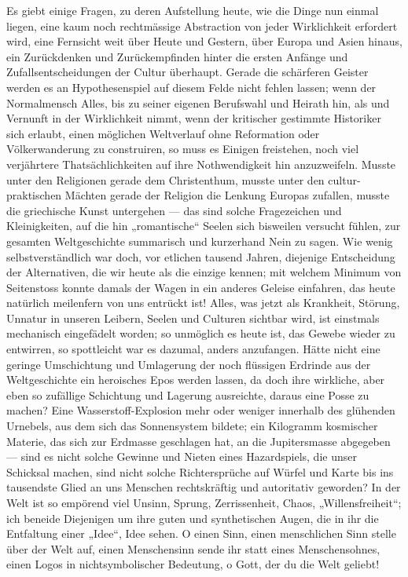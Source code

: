 Es giebt einige Fragen, zu deren Aufstellung heute, wie die Dinge nun einmal liegen, eine kaum noch rechtmässige Abstraction von jeder Wirklichkeit erfordert wird, eine Fernsicht weit über Heute und Gestern, über Europa und Asien hinaus, ein Zurückdenken und Zurückempfinden hinter die ersten Anfänge und Zufallsentscheidungen der Cultur überhaupt. Gerade die schärferen Geister werden es an Hypothesenspiel auf diesem Felde nicht fehlen lassen; wenn der Normalmensch Alles, bis zu seiner eigenen Berufswahl und Heirath hin, als  und Vernunft in der Wirklichkeit nimmt, wenn der kritischer gestimmte Historiker sich erlaubt, einen möglichen Weltverlauf ohne Reformation oder Völkerwanderung zu construiren, so muss es Einigen freistehen, noch viel verjährtere Thatsächlichkeiten auf ihre Nothwendigkeit hin anzuzweifeln. Musste unter den Religionen gerade dem Christenthum, musste unter den cultur-praktischen Mächten gerade der Religion die Lenkung Europas zufallen, musste die griechische Kunst untergehen — das sind solche Fragezeichen und Kleinigkeiten, auf die hin „romantische“ Seelen sich bisweilen versucht fühlen, zur gesamten Weltgeschichte summarisch und kurzerhand Nein zu sagen. Wie wenig selbstverständlich war doch, vor etlichen tausend Jahren, diejenige Entscheidung der Alternativen, die wir heute als die einzige kennen; mit welchem Minimum von Seitenstoss konnte damals der Wagen in ein anderes Geleise einfahren, das heute natürlich meilenfern von uns entrückt ist! Alles, was jetzt als Krankheit, Störung, Unnatur in unseren Leibern, Seelen und Culturen sichtbar wird, ist einstmals mechanisch eingefädelt worden; so unmöglich es heute ist, das Gewebe wieder zu entwirren, so spottleicht war es dazumal, anders anzufangen. Hätte nicht eine geringe Umschichtung und Umlagerung der noch flüssigen Erdrinde aus der Weltgeschichte ein heroisches Epos werden lassen, da doch ihre wirkliche, aber eben so zufällige Schichtung und Lagerung ausreichte, daraus eine Posse zu machen? Eine Wasserstoff-Explosion mehr oder weniger innerhalb des glühenden Urnebels, aus dem sich das Sonnensystem bildete; ein Kilogramm kosmischer Materie, das sich zur Erdmasse geschlagen hat, an die Jupitersmasse abgegeben — sind es nicht solche Gewinne und Nieten eines Hazardspiels, die unser Schicksal machen, sind nicht solche Richtersprüche auf Würfel und Karte bis ins tausendste Glied an uns Menschen rechtskräftig und autoritativ geworden? In der Welt ist so empörend viel Unsinn, Sprung, Zerrissenheit, Chaos, „Willensfreiheit“; ich beneide Diejenigen um ihre guten und synthetischen Augen, die in ihr die Entfaltung einer „Idee“,  Idee sehen. O einen Sinn, einen menschlichen Sinn stelle über der Welt auf, einen Menschensinn sende ihr statt eines Menschensohnes, einen Logos in nichtsymbolischer Bedeutung, o Gott, der du die Welt geliebt!
\par

